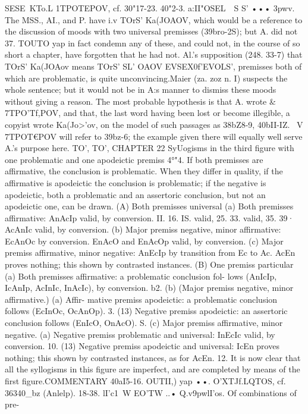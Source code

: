 {{{{{{{{{{{{{SESE~KTo.L 1TPOTEPOV, cf. 30"17-23.
40"2-3. a:II"OSEL~~S S' ••• 3pwv. The MSS., AI., and P. have i.v
TOrS' Ka(JOAOV, which would be a reference to the discussion of
moods with two universal premisses (39bro-2S); but A. did not
37. TOUTO yap
in fact condemn any of these, and could not, in the course of so
short a chapter, have forgotten that he had not. Al.'s supposition
(248. 33-7) that TOrS' Ka(JOAov means TOrS' SL' OAOV EVSEX0f'EVOLS',
premisses both of which are problematic, is quite unconvincing.Maier (za. zoz n. I) suspects the whole sentence; but it would
not be in A:s manner to dismiss these moods without giving
a reason. The most probable hypothesis is that A. wrote &
7TPO'Tf,POV, and that, the last word having been lost or become
illegible, a copyist wrote Ka(Jo>'ov, on the model of such passages
as 38bZ8-9, 40bII-IZ. ~V
7TPOT€POV will refer to 39bz-6; the
example given there will equally well serve A.'s purpose here.
TO',
TO',
CHAPTER 22
SyUogisms in the third figure with one problematic and one apodeictic
premiss
4°"4. If both premisses are affirmative, the conclusion is
problematic. When they differ in quality, if the affirmative
is apodeictic the conclusion is problematic; if the negative is
apodeictic, both a problematic and an assertoric conclusion, but
not an apodeictic one, can be drawn.
(A) Both premisses universal
(a) Both premisses affirmative: AnAcIp valid, by conversion.
II.
16.
IS.
valid,
25.
33.
valid,
35.
39·
AcAnIc valid, by conversion.
(b) Major premiss negative, minor affirmative: EcAnOc
by conversion.
EnAcO and EnAcOp valid, by conversion.
(c) Major premiss affirmative, minor negative: AnEcIp
by transition from Ec to Ac.
AcEn proves nothing; this shown by contrasted instances.
(B) One premiss particular
(a) Both premisses affirmative: a problematic conclusion fol-
lows (AnIcIp, IcAnIp, AcInIc, InAcIc), by conversion.
b2. (b) (Major premiss negative, minor affirmative.) (a) Affir-
mative premiss apodeictic: a problematic conclusion follows
(EcInOc, OcAnOp).
3. (13) Negative premiss apodeictic: an assertoric conclusion
follows (EnIcO, OnAcO).
S. (c) Major premiss affirmative, minor negative. (a) Negative
premiss problematic and universal: InEcIc valid, by conversion.
10. (13) Negative premiss apodeictic and universal: IcEn proves
nothing; this shown by contrasted instances, as for AcEn.
12. It is now clear that all the syllogisms in this figure are
imperfect, and are completed by means of the first figure.COMMENTARY
40aI5-16. OUTII,) yap ••. O'XTJf.LQTOS, cf. 36340_bz (Anlelp).
18-38. lI'c1~W EO'TW ..• Q.v9pwlI'os. Of combinations of pre-
}}}}}}}}}}}}}

